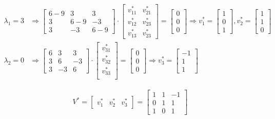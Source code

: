 \documentclass[a4paper, spanish]{article}
\begin{document}
  \begin{align}
    \lambda_1 = 3 &\Rightarrow
    \begin{bmatrix}
      6 - 9 & 3 & 3 \\
      3 & 6 - 9 & -3 \\
      3 & -3 & 6 - 9
    \end{bmatrix}
    \cdot
    \begin{bmatrix}
      v_{11}^* & v_{21}^*\\
      v_{12}^* & v_{23}^*\\
      v_{13}^* & v_{23}^*
    \end{bmatrix}
    =
    \begin{bmatrix}
      0 \\
      0 \\
      0
    \end{bmatrix}
    \Rightarrow
    v_1^* =
    \begin{bmatrix}
      1 \\
      0 \\
      1
    \end{bmatrix},
    v_2^* =
    \begin{bmatrix}
      1 \\
      1 \\
      0
    \end{bmatrix}\\
    \lambda_2 = 0 &\Rightarrow
    \begin{bmatrix}
      6 & 3 & 3 \\
      3 & 6 & -3 \\
      3 & -3 & 6
    \end{bmatrix}
    \cdot
    \begin{bmatrix}
      v_{31}^* \\
      v_{32}^* \\
      v_{33}^* \\
    \end{bmatrix}
    =
    \begin{bmatrix}
      0 \\
      0 \\
      0
    \end{bmatrix}
    \Rightarrow
    v_3^* =
    \begin{bmatrix}
      -1 \\
      1 \\
      1
    \end{bmatrix}
  \end{align}

  \begin{align}
    V^* =
    \begin{bmatrix}
      v_1^* & v_2^* & v_3^*
    \end{bmatrix} =
    \begin{bmatrix}
      1 & 1 & -1 \\
      0 & 1 & 1 \\
      1 & 0 & 1
    \end{bmatrix}
  \end{align}
\end{document}
